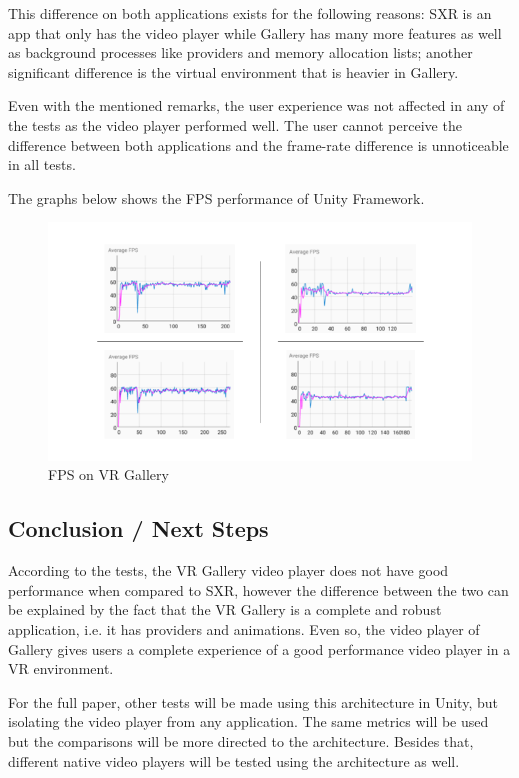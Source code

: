 \documentclass[runningheads]{llncs}
\begin{document}
This difference on both applications exists for the following reasons: SXR is an app that only has the video player while Gallery has many more features as well as background processes like providers and memory allocation lists; another significant difference is the virtual environment that is heavier in Gallery.

Even with the mentioned remarks, the user experience was not affected in any of the tests as the video player performed well. The user cannot perceive the difference between both applications and the frame-rate difference is unnoticeable in all tests.

The graphs below shows the FPS performance of Unity Framework.

\begin{figure}[h!]
    \centerline{\includegraphics[scale=0.45]{images/Gallery.png}}
    \caption{FPS on VR Gallery}
    \label{gallery-graph}
\end{figure}

\subsection{Conclusion / Next Steps}

According to the tests, the VR Gallery video player does not have good performance when compared to SXR, however the difference between the two can be explained by the fact that the VR Gallery is a complete and robust application, i.e. it has providers and animations. Even so, the video player of Gallery gives users a complete experience of a good performance video player in a VR environment.

For the full paper, other tests will be made using this architecture in Unity, but isolating the video player from any application. The same metrics will be used but the comparisons will be more directed to the architecture. Besides that, different native video players will be tested using the architecture as well.

%
%
%


\end{document}
